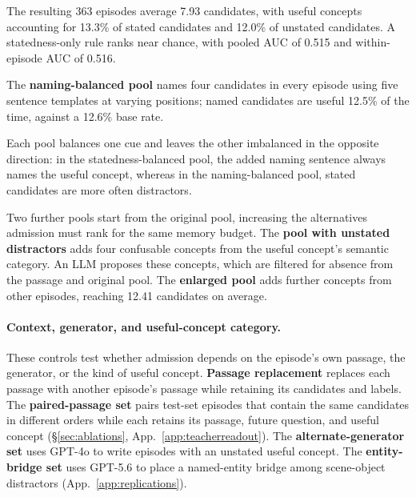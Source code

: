 The resulting 363 episodes average 7.93 candidates, with useful
concepts accounting for 13.3\% of stated candidates and 12.0\% of
unstated candidates. A statedness-only rule ranks near chance, with
pooled AUC of 0.515 and within-episode AUC of 0.516.

The \textbf{naming-balanced pool} names four candidates in every
episode using five sentence templates at varying positions; named
candidates are useful 12.5\% of the time, against a 12.6\% base rate.

Each pool balances one cue and leaves the other imbalanced in the
opposite direction: in the statedness-balanced pool, the added naming
sentence always names the useful concept, whereas in the
naming-balanced pool, stated candidates are more often distractors.

Two further pools start from the original pool, increasing the
alternatives admission must rank for the same memory budget.
The \textbf{pool with unstated distractors} adds four confusable
concepts from the useful concept's semantic category. An LLM proposes these
concepts, which are filtered for absence from the passage and
original pool. The \textbf{enlarged pool} adds further concepts from
other episodes, reaching 12.41 candidates on average.

\paragraph{Context, generator, and useful-concept category.}
These controls test whether admission depends on the episode's own
passage, the generator, or the kind of useful concept.
\textbf{Passage replacement} replaces each passage with another
episode's passage while retaining its candidates and labels.
The \textbf{paired-passage set} pairs test-set episodes that
contain the same candidates in different orders while each retains
its passage, future question, and useful concept
(\S\ref{sec:ablations}, App.~\ref{app:teacherreadout}).
The \textbf{alternate-generator set} uses GPT-4o to write episodes
with an unstated useful concept. The \textbf{entity-bridge set} uses
GPT-5.6 to place a named-entity bridge among scene-object distractors
(App.~\ref{app:replications}).

